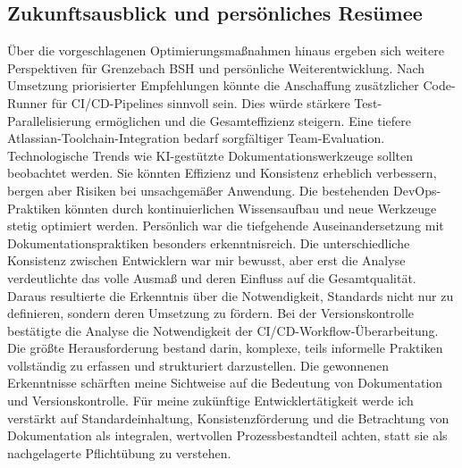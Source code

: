 \documentclass[12pt,oneside]{article}
\begin{document}
    \subsection{Zukunftsausblick und persönliches Resümee}
    \label{subsec:zukunft}
    Über die vorgeschlagenen Optimierungsmaßnahmen hinaus ergeben sich weitere Perspektiven für Grenzebach BSH und persönliche Weiterentwicklung.
    \newline
    Nach Umsetzung priorisierter Empfehlungen könnte die Anschaffung zusätzlicher Code-Runner für CI/CD-Pipelines sinnvoll sein. Dies würde stärkere Test-Parallelisierung ermöglichen und die Gesamteffizienz steigern. Eine tiefere Atlassian-Toolchain-Integration bedarf sorgfältiger Team-Evaluation. Technologische Trends wie KI-gestützte Dokumentationswerkzeuge sollten beobachtet werden. Sie könnten Effizienz und Konsistenz erheblich verbessern, bergen aber Risiken bei unsachgemäßer Anwendung. Die bestehenden DevOps-Praktiken könnten durch kontinuierlichen Wissensaufbau und neue Werkzeuge stetig optimiert werden.
    \newlineT
    Persönlich war die tiefgehende Auseinandersetzung mit Dokumentationspraktiken besonders erkenntnisreich. Die unterschiedliche Konsistenz zwischen Entwicklern war mir bewusst, aber erst die Analyse verdeutlichte das volle Ausmaß und deren Einfluss auf die Gesamtqualität. Daraus resultierte die Erkenntnis über die Notwendigkeit, Standards nicht nur zu definieren, sondern deren Umsetzung zu fördern. Bei der Versionskontrolle bestätigte die Analyse die Notwendigkeit der CI/CD-Workflow-Überarbeitung. Die größte Herausforderung bestand darin, komplexe, teils informelle Praktiken vollständig zu erfassen und strukturiert darzustellen.
    \newline
    Die gewonnenen Erkenntnisse schärften meine Sichtweise auf die Bedeutung von Dokumentation und Versionskontrolle. Für meine zukünftige Entwicklertätigkeit werde ich verstärkt auf Standardeinhaltung, Konsistenzförderung und die Betrachtung von Dokumentation als integralen, wertvollen Prozessbestandteil achten, statt sie als nachgelagerte Pflichtübung zu verstehen.


    \clearpage
    

    \clearpage
    \def\UrlBreaks{\do\/\do-} %
    
    


    
\end{document}
